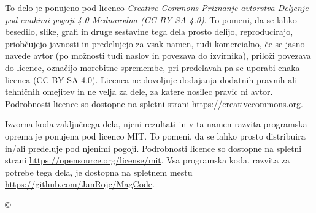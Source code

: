 \thispagestyle{empty}
\vspace*{\fill}
{\noindent\footnotesize


\vspace*{5cm}
{\small \noindent
To delo je ponujeno pod licenco \textit{Creative Commons Priznanje avtorstva-Deljenje pod enakimi pogoji 4.0 Mednarodna (CC BY-SA 4.0)}.
To pomeni, da se lahko besedilo, slike, grafi in druge sestavine tega dela prosto delijo, reproducirajo, priobčujejo javnosti in predelujejo za vsak namen, tudi komercialno, če se jasno navede avtor (po možnosti tudi naslov in povezava do izvirnika), priloži povezava do licence, označijo morebitne spremembe, pri predelavah pa se uporabi enaka licenca (CC BY-SA 4.0). Licenca ne dovoljuje dodajanja dodatnih pravnih ali tehničnih omejitev in ne velja za dele, za katere nosilec pravic ni avtor.
Podrobnosti licence so dostopne na spletni strani \url{https://creativecommons.org}.

\begin{center}%
\hspace*{1ex}\hspace*{1ex}%
\end{center}
}


\ifCODEPUBLISHED
\vspace*{1.5cm}
{\small \noindent
Izvorna koda zaključnega dela, njeni rezultati in v ta namen razvita programska
oprema je ponujena pod licenco MIT. To pomeni, da se lahko prosto distribuira
in/ali predeluje pod njenimi pogoji. Podrobnosti licence so dostopne na spletni
strani \url{https://opensource.org/license/mit}.
Vsa programska koda, razvita za potrebe tega dela, je dostopna na spletnem
mestu \url{https://github.com/JanRojc/MagCode}.
}

\fi

}
\begin{center}
{\footnotesize{\sc \copyright \myyear\ \tauthor}}
\end{center} 